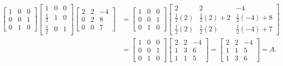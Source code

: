 \documentclass{report}
\begin{document}
    \begin{align*}
        \begin{bmatrix}
            1 & 0 & 0 \\
            0 & 0 &  1 \\
            0 & 1 & 0 
        \end{bmatrix}
        \begin{bmatrix}
            1 & 0 & 0 \\
            \frac{1}{2} & 1 & 0 \\
            \frac{1}{2} & 0 & 1
        \end{bmatrix}
        \begin{bmatrix}
            2 & 2 & -4 \\
            0 & 2 & 8 \\
            0 & 0 & 7 
        \end{bmatrix}
        &= 
        \begin{bmatrix}
            1 & 0 & 0 \\
            0 & 0 & 1 \\
            0 & 1 & 0
        \end{bmatrix}
        \begin{bmatrix}
            2 & 2 & -4 \\
            \frac{1}{2}(2) & \frac{1}{2}(2) + 2 & \frac{1}{2}(-4) + 8 \\
            \frac{1}{2}(2) & \frac{1}{2}(2)  &\frac{1}{2}(-4) + 7 
        \end{bmatrix} \\
        &=
        \begin{bmatrix}
        1 & 0 & 0 \\
        0 & 0 & 1\\
        0 & 1 & 0
        \end{bmatrix}
        \begin{bmatrix}
            2 & 2 & -4 \\
            1 & 3 & 6 \\
            1 & 1 & 5
        \end{bmatrix}
        =
        \begin{bmatrix}
            2 & 2 & -4 \\
            1 & 1 & 5 \\
            1 & 3 & 6 
        \end{bmatrix} = A
    .\end{align*}
\end{document}
